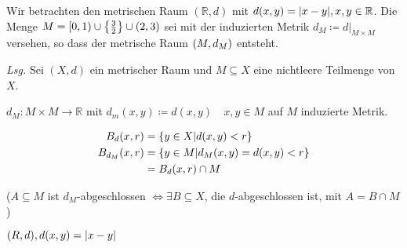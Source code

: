 \documentclass{article}
\begin{document}
\newpage
Wir betrachten den metrischen Raum $(\mathbb{R}, d)$ mit $d(x, y) = \abs{x - y}, x, y \in \mathbb{R}$.
Die Menge $M = [0, 1) \cup \qty{\frac{3}{2}} \cup(2, 3)$ sei mit der induzierten Metrik
$d_M \coloneqq d|_{M \times M}$ versehen, so dass der metrische Raum $\qty(M, d_M)$ entsteht.

\textit{Lsg.} Sei $(X, d)$ ein metrischer Raum und $M \subseteq X$ eine nichtleere Teilmenge von $X$.

$d_M \colon M \times M \to \mathbb{R}$ mit $d_m(x, y) \coloneqq d(x, y) \quad x, y \in M$
auf $M$ induzierte Metrik.

\begin{align*}
  B_d(x, r) &= \qty{ y \in X \middle| d(x, y) < r } \\
  B_{d_M}(x, r) &= \qty{ y \in M \middle| d_M(x, y) = d(x, y) < r } \\
            &= B_d(x, r) \cap M
\end{align*}

($A \subseteq M$ ist $d_M$-abgeschlossen $\iff \exists B \subseteq X$, die $d$-abgeschlossen ist, mit $A = B \cap M$)

$(R, d), d(x, y) = \abs{x - y}$
\end{document}
